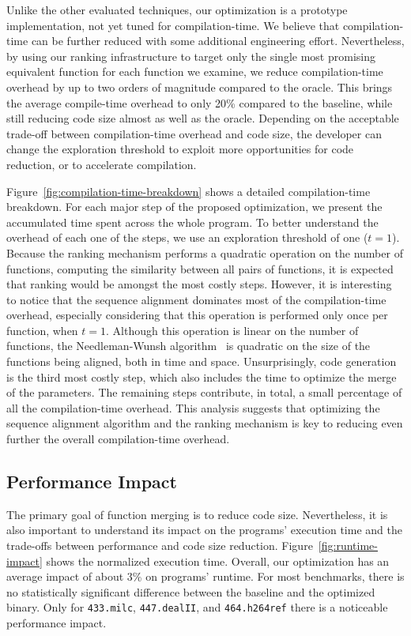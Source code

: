 Unlike the other evaluated techniques, our optimization is a prototype implementation, not yet tuned for compilation-time. We believe that
compilation-time can be further reduced with some additional engineering effort. Nevertheless, by using our ranking infrastructure to
target only the single most promising equivalent function for each function we examine, we reduce compilation-time overhead by up to two
orders of magnitude compared to the oracle. This brings the average compile-time overhead to only 20\% compared to the baseline, while
still reducing code size almost as well as the oracle. Depending on the acceptable trade-off between compilation-time overhead and code
size, the developer can change the exploration threshold to exploit more opportunities for code reduction, or to accelerate compilation.

Figure~\ref{fig:compilation-time-breakdown} shows a detailed compilation-time breakdown. For each major step of the proposed optimization,
we present the accumulated time spent across the whole program. To better understand the overhead of each one of the steps, we use an
exploration threshold of one ($t = 1$). Because the ranking mechanism performs a quadratic operation on the number of functions, computing
the similarity between all pairs of functions, it is expected that ranking would be amongst the most costly steps. However, it is
interesting to notice that the sequence alignment dominates most of the compilation-time overhead, especially considering that this
operation is performed only once per function, when $t = 1$. Although this operation is linear on the number of functions, the
Needleman-Wunsh algorithm~\cite{needleman70} is quadratic on the size of the functions being aligned, both in time and space.
Unsurprisingly, code generation is the third most costly step, which also includes the time to optimize the merge of the parameters. The
remaining steps contribute, in total, a small percentage of all the compilation-time overhead. This analysis suggests that optimizing the
sequence alignment algorithm and the ranking mechanism is key to reducing even further the overall compilation-time overhead.

\subsection{Performance Impact}


The primary goal of function merging is to reduce code size. Nevertheless, it is also important to understand its impact on the programs'
execution time and the trade-offs between performance and code size reduction. Figure~\ref{fig:runtime-impact} shows the normalized
execution time. Overall, our optimization has an average impact of about 3\% on programs' runtime. For most benchmarks, there is no
statistically significant difference between the baseline and the optimized binary. Only for \texttt{433.milc}, \texttt{447.dealII}, and
\texttt{464.h264ref} there is a noticeable performance impact.

